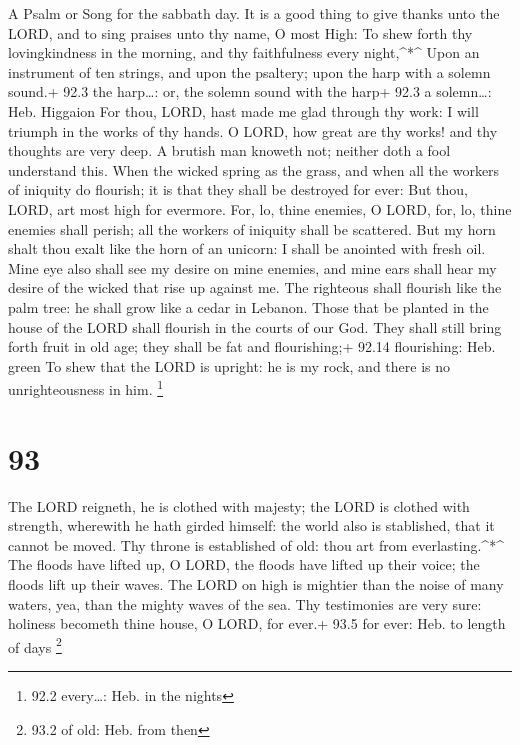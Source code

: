 A Psalm or Song for the sabbath day.  It is a good thing to
give thanks unto the LORD, and to sing praises unto thy name, O most
High:  To shew forth thy lovingkindness in the morning, and
thy faithfulness every night,\^{}*\^{}  Upon an instrument
of ten strings, and upon the psaltery; upon the harp with a solemn
sound.+ 92.3 the harp\ldots: or, the solemn sound with the harp+ 92.3 a
solemn\ldots: Heb. Higgaion  For thou, LORD, hast made me
glad through thy work: I will triumph in the works of thy hands.
 O LORD, how great are thy works! and thy thoughts are very
deep.  A brutish man knoweth not; neither doth a fool
understand this.  When the wicked spring as the grass, and
when all the workers of iniquity do flourish; it is that they shall be
destroyed for ever:  But thou, LORD, art most high for
evermore.  For, lo, thine enemies, O LORD, for, lo, thine
enemies shall perish; all the workers of iniquity shall be scattered.
 But my horn shalt thou exalt like the horn of an unicorn:
I shall be anointed with fresh oil.  Mine eye also shall
see my desire on mine enemies, and mine ears shall hear my desire of the
wicked that rise up against me.  The righteous shall
flourish like the palm tree: he shall grow like a cedar in Lebanon.
 Those that be planted in the house of the LORD shall
flourish in the courts of our God.  They shall still bring
forth fruit in old age; they shall be fat and flourishing;+ 92.14
flourishing: Heb. green  To shew that the LORD is upright:
he is my rock, and there is no unrighteousness in him. \footnote{92.2
  every\ldots: Heb. in the nights}

\hypertarget{section-92}{%
\section{93}\label{section-92}}

 The LORD reigneth, he is clothed with majesty; the LORD is
clothed with strength, wherewith he hath girded himself: the world also
is stablished, that it cannot be moved.  Thy throne is
established of old: thou art from everlasting.\^{}*\^{}  The
floods have lifted up, O LORD, the floods have lifted up their voice;
the floods lift up their waves.  The LORD on high is
mightier than the noise of many waters, yea, than the mighty waves of
the sea.  Thy testimonies are very sure: holiness becometh
thine house, O LORD, for ever.+ 93.5 for ever: Heb. to length of days
\footnote{93.2 of old: Heb. from then}


